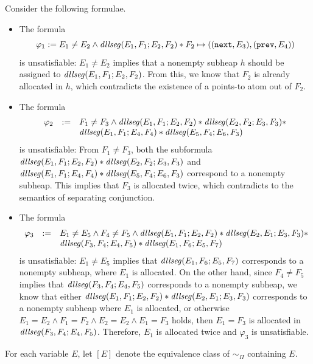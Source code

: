 \documentclass{llncs}
\begin{document}
\begin{example}\label{exmp-dllseg-sat}
Consider the following formulae.
\begin{itemize}
\item The formula 
$$\varphi_1:= E_1 \neq E_2 \wedge \mathit{dllseg}(E_1,F_1; E_2, F_2) \ast F_2 \mapsto ((\mathtt{next},E_3),(\mathtt{prev},E_4))$$ 
is unsatisfiable: $E_1 \neq E_2$ implies that a nonempty subheap $h$ should be assigned to $\mathit{dllseg}(E_1, F_1; E_2, F_2)$. From this, we know that $F_2$ is already allocated in $h$, which contradicts the existence of a points-to atom out of $F_2$.
%
\item The formula 
$$
\begin{array}{l c l}
\varphi_2 & := & F_1 \neq F_3 \wedge \mathit{dllseg}(E_1, F_1; E_2, F_2) \ast  \mathit{dllseg}(E_2, F_2; E_3, F_3) \ast \\
& & \mathit{dllseg}(E_1, F_1; E_4, F_4) \ast \mathit{dllseg}(E_5, F_4; E_6, F_3)
\end{array}
$$ 
is unsatisfiable: From $F_1 \neq F_3$,  both the subformula $\mathit{dllseg}(E_1, F_1; E_2, F_2) \ast  \mathit{dllseg}(E_2, F_2; E_3, F_3)$ and $\mathit{dllseg}(E_1, F_1; E_4, F_4) \ast \mathit{dllseg}(E_5, F_4; E_6, F_3)$ correspond to a nonempty subheap. This implies that $F_3$ is allocated twice, which contradicts to the semantics of separating conjunction.
%
\item The formula 
$$
\begin{array}{l c l}
\varphi_3 &:=& E_1 \neq E_5 \wedge F_4 \neq F_5 \wedge \mathit{dllseg}(E_1, F_1; E_2, F_2) \ast \mathit{dllseg}(E_2, E_1; E_3, F_3) \ast \\
& & \mathit{dllseg}(F_3, F_4; E_4, F_5) \ast \mathit{dllseg}(E_1, F_6; E_5, F_7)
\end{array}
$$ 
is unsatisfiable: $E_1 \neq E_5$ implies that $\mathit{dllseg}(E_1, F_6; E_5, F_7)$ corresponds to a nonempty subheap, where $E_1$ is allocated. On the other hand, since $F_4 \neq F_5$ implies that $\mathit{dllseg}(F_3, F_4; E_4, F_5)$ corresponds to a nonempty subheap, we know that either $\mathit{dllseg}(E_1, F_1; E_2, F_2) \ast \mathit{dllseg}(E_2, E_1; E_3, F_3)$ corresponds to a nonempty subheap where $E_1$ is allocated, or otherwise $E_1 = E_2 \wedge F_1 = F_2 \wedge E_2 = E_2 \wedge E_1 = F_3$ holds, then $E_1=F_3$ is allocated in $\mathit{dllseg}(F_3, F_4; E_4, F_5)$. Therefore, $E_1$ is allocated twice and $\varphi_3$ is unsatisfiable.
\end{itemize}
\end{example}

For each variable $E$, let $[E]$ denote the equivalence class of $\sim_\Pi$ containing $E$.
\end{document}

